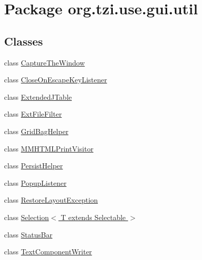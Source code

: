\hypertarget{namespaceorg_1_1tzi_1_1use_1_1gui_1_1util}{\section{Package org.\-tzi.\-use.\-gui.\-util}
\label{namespaceorg_1_1tzi_1_1use_1_1gui_1_1util}
}
\subsection*{Classes}
\begin{DoxyCompactItemize}
\item 
class \hyperlink{classorg_1_1tzi_1_1use_1_1gui_1_1util_1_1_capture_the_window}{Capture\-The\-Window}
\item 
class \hyperlink{classorg_1_1tzi_1_1use_1_1gui_1_1util_1_1_close_on_escape_key_listener}{Close\-On\-Escape\-Key\-Listener}
\item 
class \hyperlink{classorg_1_1tzi_1_1use_1_1gui_1_1util_1_1_extended_j_table}{Extended\-J\-Table}
\item 
class \hyperlink{classorg_1_1tzi_1_1use_1_1gui_1_1util_1_1_ext_file_filter}{Ext\-File\-Filter}
\item 
class \hyperlink{classorg_1_1tzi_1_1use_1_1gui_1_1util_1_1_grid_bag_helper}{Grid\-Bag\-Helper}
\item 
class \hyperlink{classorg_1_1tzi_1_1use_1_1gui_1_1util_1_1_m_m_h_t_m_l_print_visitor}{M\-M\-H\-T\-M\-L\-Print\-Visitor}
\item 
class \hyperlink{classorg_1_1tzi_1_1use_1_1gui_1_1util_1_1_persist_helper}{Persist\-Helper}
\item 
class \hyperlink{classorg_1_1tzi_1_1use_1_1gui_1_1util_1_1_popup_listener}{Popup\-Listener}
\item 
class \hyperlink{classorg_1_1tzi_1_1use_1_1gui_1_1util_1_1_restore_layout_exception}{Restore\-Layout\-Exception}
\item 
class \hyperlink{classorg_1_1tzi_1_1use_1_1gui_1_1util_1_1_selection_3_01_t_01extends_01_selectable_01_4}{Selection$<$ T extends Selectable $>$}
\item 
class \hyperlink{classorg_1_1tzi_1_1use_1_1gui_1_1util_1_1_status_bar}{Status\-Bar}
\item 
class \hyperlink{classorg_1_1tzi_1_1use_1_1gui_1_1util_1_1_text_component_writer}{Text\-Component\-Writer}
\end{DoxyCompactItemize}
